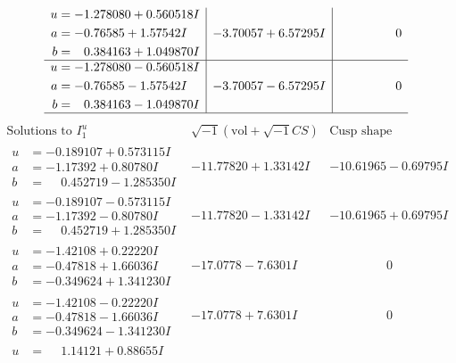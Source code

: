 \documentclass[1p]{elsarticle_modified}
\theoremstyle{definition}
\newcommand{\I}{\sqrt{-1}}
\begin{document}
$$\begin{array}{c|c|c}
\begin{aligned}
u &= -1.278080 + 0.560518 I \\
a &= -0.76585 + 1.57542 I \\
b &= \phantom{-}0.384163 + 1.049870 I\end{aligned}
 & -3.70057 + 6.57295 I & \phantom{-0.000000 } 0 \\ \hline\begin{aligned}
u &= -1.278080 - 0.560518 I \\
a &= -0.76585 - 1.57542 I \\
b &= \phantom{-}0.384163 - 1.049870 I\end{aligned}
 & -3.70057 - 6.57295 I & \phantom{-0.000000 } 0\\
 \hline 
 \end{array}$$\newpage$$\begin{array}{c|c|c}  
\text{Solutions to }I^u_{1}& \I (\text{vol} + \sqrt{-1}CS) & \text{Cusp shape}\\
 \hline 
\begin{aligned}
u &= -0.189107 + 0.573115 I \\
a &= -1.17392 + 0.80780 I \\
b &= \phantom{-}0.452719 - 1.285350 I\end{aligned}
 & -11.77820 + 1.33142 I & -10.61965 - 0.69795 I \\ \hline\begin{aligned}
u &= -0.189107 - 0.573115 I \\
a &= -1.17392 - 0.80780 I \\
b &= \phantom{-}0.452719 + 1.285350 I\end{aligned}
 & -11.77820 - 1.33142 I & -10.61965 + 0.69795 I \\ \hline\begin{aligned}
u &= -1.42108 + 0.22220 I \\
a &= -0.47818 + 1.66036 I \\
b &= -0.349624 + 1.341230 I\end{aligned}
 & -17.0778 - 7.6301 I & \phantom{-0.000000 } 0 \\ \hline\begin{aligned}
u &= -1.42108 - 0.22220 I \\
a &= -0.47818 - 1.66036 I \\
b &= -0.349624 - 1.341230 I\end{aligned}
 & -17.0778 + 7.6301 I & \phantom{-0.000000 } 0 \\ \hline\begin{aligned}
u &= \phantom{-}1.14121 + 0.88655 I \\

\end{aligned}
\end{array}$$
\end{document}
